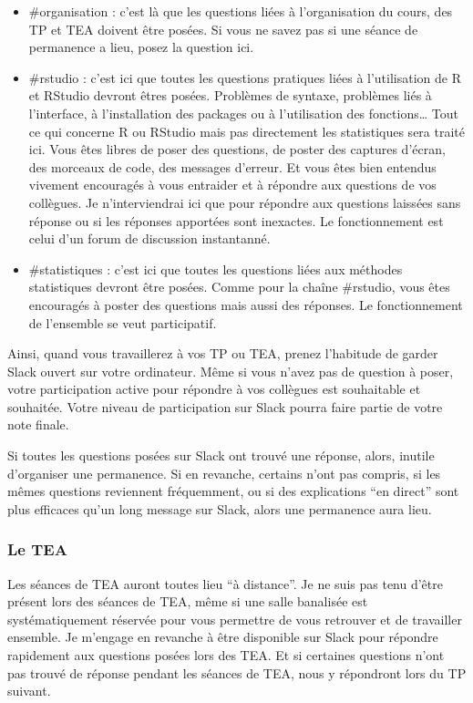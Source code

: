 \documentclass[a4paperpaper,]{article}
\providecommand{\tightlist}{%
  \setlength{\itemsep}{0pt}\setlength{\parskip}{0pt}}
\begin{document}
\begin{itemize}
\tightlist
\item
  \#organisation : c'est là que les questions liées à l'organisation du cours, des TP et TEA doivent être posées. Si vous ne savez pas si une séance de permanence a lieu, posez la question ici.
\item
  \#rstudio : c'est ici que toutes les questions pratiques liées à l'utilisation de R et RStudio devront êtres posées. Problèmes de syntaxe, problèmes liés à l'interface, à l'installation des packages ou à l'utilisation des fonctions\ldots{} Tout ce qui concerne R ou RStudio mais pas directement les statistiques sera traité ici. Vous êtes libres de poser des questions, de poster des captures d'écran, des morceaux de code, des messages d'erreur. Et vous êtes bien entendus vivement encouragés à vous entraider et à répondre aux questions de vos collègues. Je n'interviendrai ici que pour répondre aux questions laissées sans réponse ou si les réponses apportées sont inexactes. Le fonctionnement est celui d'un forum de discussion instantanné.
\item
  \#statistiques : c'est ici que toutes les questions liées aux méthodes statistiques devront être posées. Comme pour la chaîne \#rstudio, vous êtes encouragés à poster des questions mais aussi des réponses. Le fonctionnement de l'ensemble se veut participatif.
\end{itemize}

Ainsi, quand vous travaillerez à vos TP ou TEA, prenez l'habitude de garder Slack ouvert sur votre ordinateur. Même si vous n'avez pas de question à poser, votre participation active pour répondre à vos collègues est souhaitable et souhaitée. Votre niveau de participation sur Slack pourra faire partie de votre note finale.

Si toutes les questions posées sur Slack ont trouvé une réponse, alors, inutile d'organiser une permanence. Si en revanche, certains n'ont pas compris, si les mêmes questions reviennent fréquemment, ou si des explications ``en direct'' sont plus efficaces qu'un long message sur Slack, alors une permanence aura lieu.

\hypertarget{le-tea}{%
\subsubsection{Le TEA}\label{le-tea}}

Les séances de TEA auront toutes lieu ``à distance''. Je ne suis pas tenu d'être présent lors des séances de TEA, même si une salle banalisée est systématiquement réservée pour vous permettre de vous retrouver et de travailler ensemble. Je m'engage en revanche à être disponible sur Slack pour répondre rapidement aux questions posées lors des TEA. Et si certaines questions n'ont pas trouvé de réponse pendant les séances de TEA, nous y répondront lors du TP suivant.
\end{document}
